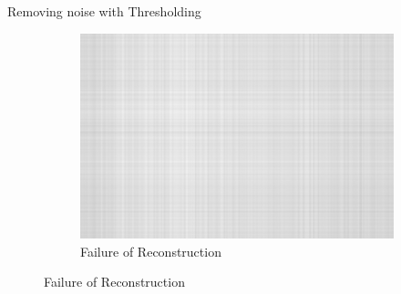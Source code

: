 \documentclass[aspectratio=169,xcolor=dvipsnames]{beamer}
\begin{document}
\begin{frame}[fragile]{Removing noise with Thresholding}
\begin{figure}
\begin{subfigure}[t]{0.3\textwidth}
				\includegraphics[width=\linewidth]{ReconstructedFailure.png} 
				\caption{Failure of Reconstruction}
			\end{subfigure}
		\end{figure}
	\end{frame}
	
\end{document}
